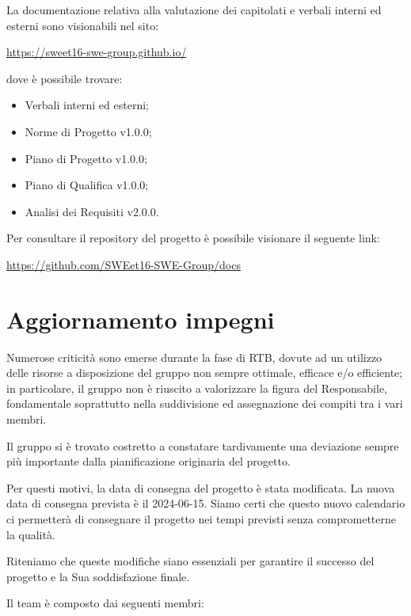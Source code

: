 \documentclass[a4paper, 11pt]{article}
\begin{document}
\par

La documentazione relativa alla valutazione dei capitolati e verbali
interni ed esterni sono visionabili nel sito:
\begin{center}
    \url{https://sweet16-swe-group.github.io/}
\end{center}
dove è possibile trovare:
\begin{itemize}
  \item Verbali interni ed esterni;
  \item Norme di Progetto v1.0.0;
  \item Piano di Progetto v1.0.0;
  \item Piano di Qualifica v1.0.0;
  \item Analisi dei Requisiti v2.0.0.
\end{itemize}

Per consultare il repository del progetto è possibile visionare il seguente link:
\begin{center}
  \url{https://github.com/SWEet16-SWE-Group/docs}
\end{center}
\par
\section{Aggiornamento impegni}
Numerose criticità sono emerse durante la fase di RTB, dovute ad un utilizzo delle risorse a disposizione del gruppo non sempre ottimale, efficace e/o efficiente; in particolare,
il gruppo non è riuscito a valorizzare la figura del Responsabile, fondamentale soprattutto nella suddivisione ed assegnazione dei compiti tra i vari membri. \\
\par
Il gruppo si è trovato costretto a constatare tardivamente una deviazione sempre più importante dalla pianificazione originaria del progetto.
\par

Per questi motivi, la data di consegna del progetto è stata modificata. La nuova data di consegna
prevista è il 2024-06-15. Siamo certi che questo nuovo calendario ci permetterà di consegnare il
progetto nei tempi previsti senza comprometterne la qualità.

\par

Riteniamo che queste modifiche siano essenziali per garantire il successo del progetto e la Sua
soddisfazione finale.

\pagebreak
Il team è composto dai seguenti membri:
\end{document}

